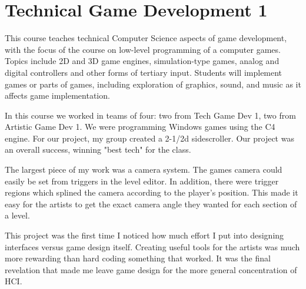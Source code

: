 \section{Technical Game Development 1}

\begin{meta}
\end{meta}

\coursedesc
This course teaches technical Computer Science aspects of game
development, with the focus of the course on low-level programming of a
computer games. Topics include 2D and 3D game engines, simulation-type
games, analog and digital controllers and other forms of tertiary input.
Students will implement games or parts of games, including exploration
of graphics, sound, and music as it affects game implementation.


\courseself
In this course we worked in teams of four: two from Tech Game Dev 1, two
from Artistic Game Dev 1. We were programming Windows games using the
C4 engine. For our project, my group created a 2-1/2d sidescroller. Our
project was an overall success, winning "best tech" for the class.

The largest piece of my work was a camera system. The games camera could
easily be set from triggers in the level editor. In addition, there
were trigger regions which splined the camera according to the player's
position. This made it easy for the artists to get the exact camera
angle they wanted for each section of a level.

This project was the first time I noticed how much effort I put into
designing interfaces versus game design itself. Creating useful tools
for the artists was much more rewarding than hard coding something that
worked. It was the final revelation that made me leave game design for
the more general concentration of HCI.


